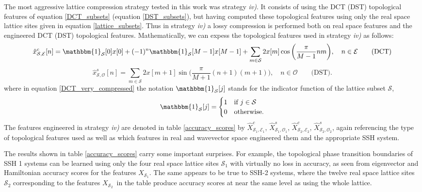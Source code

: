 \documentclass[10pt]{revtex4-1}
\newcommand{\indicator}[1]{\mathbbm{1}_{\mathcal{#1}}}
\newcommand\xSOne{$X_{\mathcal{S}_1}$}
\newcommand\xcSEOne{$\hat{X}^c_{\mathcal{S}_1,\mathcal{E}_1}$}
\newcommand\xsSOOne{$\hat{X}^s_{\mathcal{S}_1,\mathcal{O}_1}$}
\newcommand\xSTwo{$X_{\mathcal{S}_2}$}
\newcommand\xcSETwo{$\hat{X}^c_{\mathcal{S}_2,\mathcal{E}_2}$}
\newcommand\xsSOTwo{$\hat{X}^s_{\mathcal{S}_2,\mathcal{O}_2}$}
\begin{document}
The most aggressive lattice compression strategy tested in this work was strategy \emph{iv)}. It consists of using the DCT (DST) topological features of equation \eqref{DCT_subsets} (equation \eqref{DST_subsets}), but having computed these topological features using only the real space lattice sites given in equation \eqref{lattice_subsets}. Thus in strategy \emph{iv)} a lossy compression is performed both on real space features and the engineered DCT (DST) topological features. Mathematically, we can expess the topological features used in strategy \emph{iv)} as follows:
\begin{equation}
\label{DCT_very_compressed}
\hat{x}_{\mathcal{S}, \mathcal{E}}^c[n] = \indicator{\mathcal{S}}[0]x[0] + (-1)^n\indicator{\mathcal{S}}[M-1] x[M-1] + \sum_{m \in \mathcal{S}} 2x[m]\cos\bigg(\frac{\pi}{M-1}nm\bigg), \quad n \in \mathcal{E} \qquad \text{(DCT)} 
\end{equation}
\begin{equation}
\label{DST_very_compressed}
\hat{x}_{\mathcal{S}, \mathcal{O}}^s[n] = \sum_{m \in \mathcal{S}}2x[m+1]\sin\bigg(\frac{\pi}{M+1}(n+1)(m+1)\bigg), \quad n \in \mathcal{O} \qquad \text{(DST)}.
\end{equation}
where in equation \eqref{DCT_very_compressed} the notation $\mathbbm{1}_{\mathcal{S}}[j]$ stands for the indicator function of the lattice subset $\mathcal{S}$, 
\begin{equation}
\label{indicator_function}
\indicator{\mathcal{S}}[j] = \begin{cases}
      1 & \text{if } j \in \mathcal{S} \\
      0 & \text{otherwise}.
    \end{cases}
\end{equation}
The features engineered in strategy \emph{iv)} are denoted in table \ref{accuracy_scores} by \xcSEOne, \xsSOOne, \xcSETwo, \xsSOTwo, again referencing the type of topological features used as well as which features in real and wavevector space engineered them and the appropriate SSH system. 

The results shown in table \ref{accuracy_scores} carry some important surprises. For example, the topological phase transition boundaries of SSH 1 systems can be learned using only the four real space lattice sites $\mathcal{S}_1$ with virtually no loss in accuracy, as seen from eigenvector and Hamiltonian accuracy scores for the features \xSOne. The same appears to be true to SSH-2 systems, where the twelve real space lattice sites $\mathcal{S}_2$ corresponding to the features \xSTwo\ in the table produce accuracy scores at near the same level as using the whole lattice.    
\end{document}
